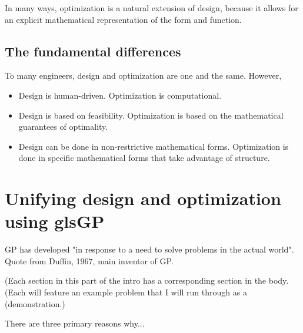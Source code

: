 In many ways, optimization is a natural extension of design, because it allows 
for an explicit mathematical representation of the form and function.

\subsection{The fundamental differences}

To many engineers, design and optimization are one and the same. However, 

\begin{itemize}
\item Design is human-driven. Optimization is computational. 
\item Design is based on feasibility. Optimization is based on the mathematical 
guarantees of optimality. 
\item Design can be done in non-restrictive mathematical forms. Optimization is 
done in specific mathematical forms that take advantage of structure. 
\end{itemize}

\section{Unifying design and optimization using gls{GP}}

\gls{GP} has developed "in response to a need to solve problems in the actual 
world".~\cite{duffingp} Quote from Duffin, 1967, main inventor of GP.

(Each section in this part of the intro has a corresponding section in the body.
(Each will feature an example problem that I will run through as a
(demonstration.)

There are three primary reasons why...


